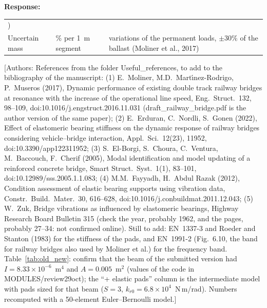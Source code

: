 \documentclass[11pt]{article}
\newenvironment{response}{\par\smallskip\noindent\color{resp}\textbf{Response:}\ }{\par}
\newcommand{\authornote}[1]{\textcolor{note}{\textsf{[Authors: #1]}}}
\begin{document}
\begin{response}
\begin{table}[H]
\begin{tabular}{>{\raggedright\arraybackslash}p{3.1cm}>{\raggedright\arraybackslash}p{4.3cm}%
>{\raggedright\arraybackslash}p{7.4cm}}
2012) \\
Uncertain mass & 5\% per 1~m segment & variations of the permanent loads, $\pm30\%$ of the ballast (Moliner et al.,
2017) \\
\bottomrule
\end{tabular}
\end{table}
\authornote{References from the folder Useful\_references, to add to the bibliography of the manuscript:
(1) E.~Moliner, M.D.~Mart\'{\i}nez-Rodrigo, P.~Museros (2017), Dynamic performance of existing double track railway
bridges at resonance with the increase of the operational line speed, Eng.\ Struct.\ 132, 98--109,
doi:10.1016/j.engstruct.2016.11.031 (draft\_railway\_bridge.pdf is the author version of the same paper);
(2) E.~Erduran, C.~Nordli, S.~Gonen (2022), Effect of elastomeric bearing stiffness on the dynamic response of railway
bridges considering vehicle--bridge interaction, Appl.\ Sci.\ 12(23), 11952, doi:10.3390/app122311952;
(3) S.~El-Borgi, S.~Choura, C.~Ventura, M.~Baccouch, F.~Cherif (2005), Modal identification and model updating of a
reinforced concrete bridge, Smart Struct.\ Syst.\ 1(1), 83--101, doi:10.12989/sss.2005.1.1.083;
(4) M.M.~Fayyadh, H.~Abdul Razak (2012), Condition assessment of elastic bearing supports using vibration data,
Constr.\ Build.\ Mater.\ 30, 616--628, doi:10.1016/j.conbuildmat.2011.12.043;
(5) W.~Zuk, Bridge vibrations as influenced by elastomeric bearings, Highway Research Board Bulletin 315 (check the year,
probably 1962, and the pages, probably 27--34: not confirmed online).
Still to add: EN~1337-3 and Roeder and Stanton (1983) for the stiffness of the pads, and EN~1991-2 (Fig.~6.10, the
band for railway bridges also used by Moliner et al.) for the frequency band. Table~\ref{tab:old_new}: confirm that the beam of the submitted version had $I=8.33\times10^{-6}$~m$^4$ and
$A=0.005$~m$^2$ (values of the code in MODULES/review29oct); the ``+ elastic pads'' column is the intermediate model with
pads sized for that beam ($S=3$, $k_{r0}=6.8\times10^{4}$~N\,m/rad). Numbers recomputed with a 50-element
Euler--Bernoulli model.}
\end{response}
\end{document}
